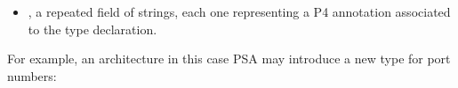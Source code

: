 \documentclass[11pt]{article}
\begin{document}
{\begin{itemize}
\begin{itemize}
\item{}
, if and only if the P4  declaration was annotated
with . It is of type ,
which itself has two fields \textemdash{}  and either  or
 \textemdash{}, which map to the two input parameters to the
annotation.%
\end{itemize}%

\item{}
, a repeated field of strings, each one representing a P4
annotation associated to the type declaration.%
\end{itemize}%

\noindent{}For example, an architecture \textemdash{} in this case PSA \textemdash{} may introduce a new type
for port numbers:%

}
\end{document}
